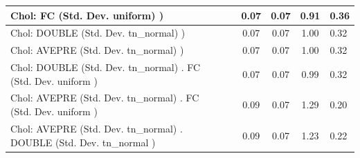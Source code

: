 \begin{table}
\begin{center}
\begin{tabular}{|l|l|c|c|c|l|}
			\hline
			 Chol: FC (Std. Dev. uniform) ) &  & 0.07 & 0.07 & 0.91 & 0.36 \\
			\hline
			 Chol: DOUBLE (Std. Dev. tn_normal) ) &  & 0.07 & 0.07 & 1.00 & 0.32 \\
			\hline
			 Chol: AVEPRE (Std. Dev. tn_normal) ) &  & 0.07 & 0.07 & 1.00 & 0.32 \\
			\hline
			 Chol: DOUBLE (Std. Dev. tn_normal) . FC (Std. Dev.   uniform ) &  & 0.07 & 0.07 & 0.99 & 0.32 \\
			\hline
			 Chol: AVEPRE (Std. Dev. tn_normal) . FC (Std. Dev.   uniform ) &  & 0.09 & 0.07 & 1.29 & 0.20 \\
			\hline
			 Chol: AVEPRE (Std. Dev. tn_normal) . DOUBLE (Std. Dev.   tn_normal ) &  & 0.09 & 0.07 & 1.23 & 0.22 \\
			\hline
		\end{tabular}
	\end{center}
\end{table}